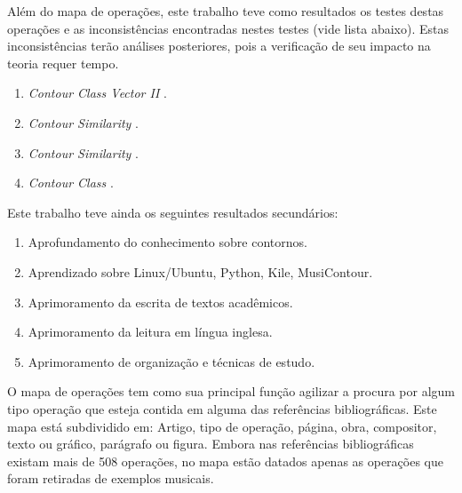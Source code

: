 \documentclass[11pt]{article}
\newcommand{\eng}[1]{\textit{#1}}
\begin{document}
Além do mapa de operações, este trabalho teve como resultados os
testes destas operações e as inconsistências encontradas nestes testes
(vide lista abaixo). Estas inconsistências terão análises posteriores,
pois a verificação de seu impacto na teoria requer tempo.

\begin{enumerate}
\item \eng{Contour Class Vector II} \cite[p. 241]{Friedmann1985}.
\item \eng{Contour Similarity} \cite[p. 242]{Quinn1997}.
\item \eng{Contour Similarity} \cite[p. 262]{Quinn1997}.
\item \eng{Contour Class} \cite[p. 113]{Schultz2008}.
\end{enumerate}

Este trabalho teve ainda os seguintes resultados secundários:

\begin{enumerate}
\item Aprofundamento do conhecimento sobre contornos.
\item Aprendizado sobre Linux/Ubuntu, Python, Kile, MusiContour.
\item Aprimoramento da escrita de textos acadêmicos.
\item Aprimoramento da leitura em língua inglesa.
\item Aprimoramento de organização e técnicas de estudo.
\end{enumerate}

\label{sec:discussao}

O mapa de operações tem como sua principal função agilizar a procura por
algum tipo operação que esteja contida em alguma das referências bibliográficas.
Este mapa está subdividido em: Artigo, tipo de operação, página, obra, compositor,
texto ou gráfico, parágrafo ou figura. Embora nas referências bibliográficas existam
mais de 508 operações, no mapa estão datados apenas as operações que foram retiradas
de exemplos musicais.
\end{document}
